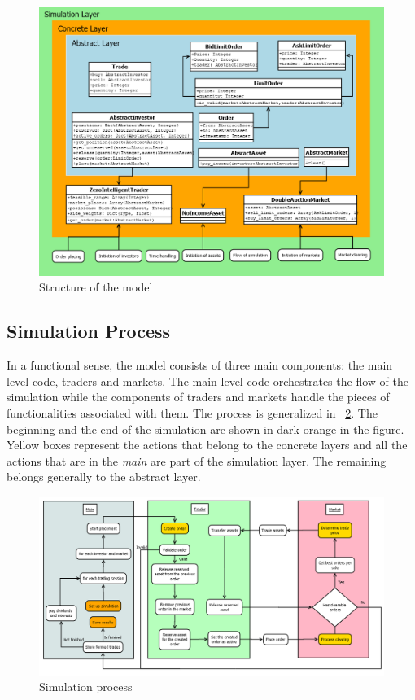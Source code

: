 \begin{figure}[H]
    \includegraphics[width=\linewidth]{diagrams/asm_layers.png}
    \caption{Structure of the model}
    \label{fig:asm_structure}
\end{figure}


\subsection{Simulation Process}
In a functional sense, the model consists of three main components:
the main level code, traders and markets. The main level code 
orchestrates the flow of the simulation while the components of traders 
and markets handle the pieces of functionalities associated with them. The process
is generalized in ~\ref{fig:sim_proc}. The beginning and the end of the 
simulation are shown in dark orange in the figure. Yellow boxes represent
the actions that belong to the concrete layers and all the actions that
are in the \textit{main} are part of the simulation layer. The remaining belongs
generally to the abstract layer.


\begin{figure}[H]
    \includegraphics[width=\linewidth]{diagrams/placement_clearing_process.png}
    \caption{Simulation process}
    \label{fig:sim_proc}
\end{figure}

